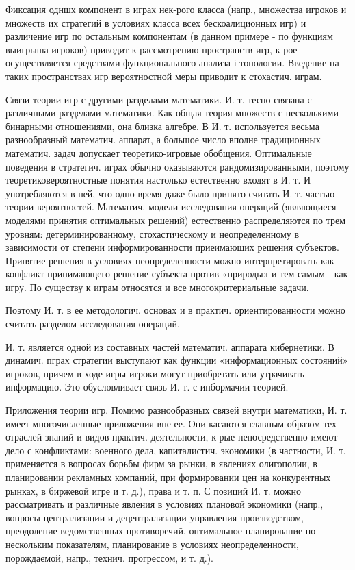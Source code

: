 \documentclass[10pt]{article}
\begin{document}
Фиксация одншх компонент в играх нек-рого класса (напр., множества игроков и множеств их стратегий в условиях класса всех бескоалиционных игр) и различение игр по остальным компонентам (в данном примере - по функциям выигрыша игроков) приводит к рассмотрению пространств игр, к-рое осуществляется средствами функционального анализа і топологии. Введение на таких пространствах игр вероятностной меры приводит к стохастич. играм.



Связи теории игр с другими разделами математики. И. т. тесно связана с различными разделами математики. Как общая теория множеств с несколькими бинарными отношениями, она близка алгебре. В И. т. используется весьма разнообразный математич. аппарат, а большое число вполне традиционных математич. задач допускает теоретико-игровые обобщения. Оптимальные поведения в стратегич. играх обычно оказываются рандомизированными, поэтому теоретиковероятностные понятия настолько естественно входят в И. т. И употребляются в ней, что одно время даже было принято считать И. т. частью теории вероятностей. Математич. модели исследования операций (являющиеся моделями принятия оптимальных решений) естественно распределяются по трем уровням: детерминированному, стохастическому и неопределенному в зависимости от степени информированности приеимаюших решения субъектов. Принятие решения в условиях неопределенности можно интерпретировать как конфликт принимающего решение субъекта против «природы» и тем самым - как игру. По существу к играм относятся и все многокритериальные задачи.



Поэтому И. т. в ее методологич. основах и в практич. ориентированности можно считать разделом исследования операций.



И. т. является одной из составных частей математич. аппарата кибернетики. В динамич. пграх стратегии выступают как функции «информационных состояний» игроков, причем в ходе игры игроки могут приобретать или утрачивать информацию. Это обусловливает связь И. т. с инбормачии теорией.



Приложения теории игр. Помимо разнообразных связей внутри математики, И. т. имеет многочисленные приложения вне ее. Они касаются главным образом тех отраслей знаний и видов практич. деятельности, к-рые непосредственно имеют дело с конфликтами: военного дела, капиталистич. экономики (в частности, И. т. применяется в вопросах борьбы фирм за рынки, в явлениях олигополии, в планировании рекламных компаний, при формировании цен на конкурентных рынках, в биржевой игре и т. д.), права и т. п. С позиций И. т. можно рассматривать и различные явления в условиях плановой экономики (напр., вопросы централизации и децентрализации управления производством, преодоление ведомственных противоречий, оптимальное планирование по нескольким показателям, планирование в условиях неопределенности, порождаемой, напр., технич. прогрессом, и т. д.).
\end{document}
